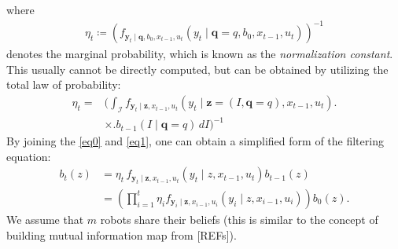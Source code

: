 \documentclass[letterpaper, 10 pt, conference]{ieeeconf}
\newcommand{\Ram}[1]{{\normalsize{\textbf{({\color{green}Ram:\ }#1)}}}}
\begin{document}
where
\begin{align*}
\eta_{t} \coloneqq \left(
	f_{\bm{y}_{t} \mid
	\bm{q},
	b_0,
	{x}_{t-1},u_t	
}\left(
y_{t} \mid
\bm{q}=q,b_0,
{x}_{t-1},u_t
\right)
\right)^{-1}
\nonumber
\end{align*}
denotes the marginal probability, which is known as the \emph{normalization constant}.
This usually cannot be directly computed, but can be obtained by utilizing the total law of probability:
\begin{align}
\eta_{t} =
&\bigg(\int_{\mathcal{I}}
f_{\bm{y}_{t} \mid
	\bm{z},
	{x}_{t-1},u_t	
}\left(
y_{t} \mid
\bm{z}=(I,\bm{q}=q),
{x}_{t-1},u_t
\right) \bigg. \nonumber \\
&\times \bigg.b_{t-1}(I\mid \bm{q} = q)
\,dI\bigg)^{-1}
\end{align}
By joining the \eqref{eq0} and \eqref{eq1}, one can obtain a simplified form of the filtering equation:
\begin{align}
b_t(z) &=
\eta_t\,
f_{\bm{y}_{t} \mid
	\bm{z},{x}_{t-1},u_t}\left(
y_{t} \mid
z,{x}_{t-1},u_t\right)
b_{t-1}(z) \nonumber\\
&=\left(\prod_{i=1}^t
\eta_i
f_{\bm{y}_{i} \mid
	\bm{z},{x}_{i-1},u_i}\left(
y_{i} \mid
z,{x}_{i-1},u_i\right) \right)
b_0(z).
\end{align}
We assume that $m$ robots share their beliefs (this is similar to the concept of building mutual information map from [REFs]).
\end{document}
